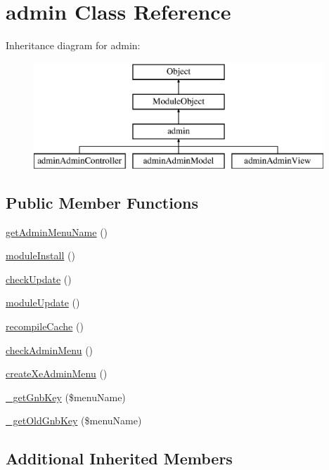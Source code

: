 \hypertarget{classadmin}{}\section{admin Class Reference}
\label{classadmin}
Inheritance diagram for admin\+:\begin{figure}[H]
\begin{center}
\leavevmode
\includegraphics[height=4.000000cm]{classadmin}
\end{center}
\end{figure}
\subsection*{Public Member Functions}
\begin{DoxyCompactItemize}
\item 
\hyperlink{classadmin_ad380bb9d26a45cb880a7bfd94ea5aa03}{get\+Admin\+Menu\+Name} ()
\item 
\hyperlink{classadmin_abd41ac19cf93c34fb1524aafac45c76e}{module\+Install} ()
\item 
\hyperlink{classadmin_a62866d2839425085eefda928670d2638}{check\+Update} ()
\item 
\hyperlink{classadmin_a57ea73a68677930fd02b4ad0f29a9549}{module\+Update} ()
\item 
\hyperlink{classadmin_a8392699186aca87dc8ce11546c2f715f}{recompile\+Cache} ()
\item 
\hyperlink{classadmin_a622d33c49486a3cc46b5a008f46ac042}{check\+Admin\+Menu} ()
\item 
\hyperlink{classadmin_a850ae671be9e3dc869230bd8daeb06ec}{create\+Xe\+Admin\+Menu} ()
\item 
\hyperlink{classadmin_a7297fe26173604ac1cd8f736474873a4}{\+\_\+get\+Gnb\+Key} (\$menu\+Name)
\item 
\hyperlink{classadmin_ad7c619fa724464fdebf9523c2654ff3b}{\+\_\+get\+Old\+Gnb\+Key} (\$menu\+Name)
\end{DoxyCompactItemize}
\subsection*{Additional Inherited Members}


